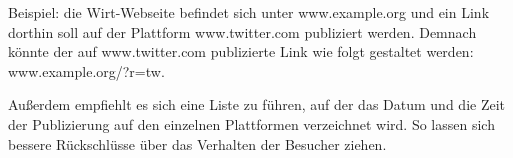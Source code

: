 Beispiel: die Wirt-Webseite befindet sich unter www.example.org und ein
Link dorthin soll auf der Plattform www.twitter.com publiziert werden.
Demnach könnte der auf www.twitter.com publizierte Link wie folgt
gestaltet werden: www.example.org/?r=tw.

Außerdem empfiehlt es sich eine Liste zu führen, auf der das Datum und
die Zeit der Publizierung auf den einzelnen Plattformen verzeichnet
wird. So lassen sich bessere Rückschlüsse über das Verhalten der
Besucher ziehen.
